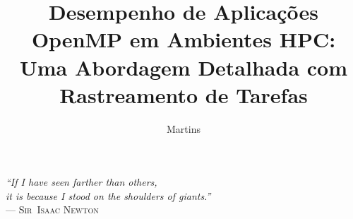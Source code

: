 \documentclass[ppgc,diss]{iiufrgs}
\title{Desempenho de Aplicações OpenMP em Ambientes HPC: Uma Abordagem Detalhada com Rastreamento de Tarefas}
\author{Martins}{Gabriel Dillenburg}
\begin{document}
\maketitle

\clearpage
\begin{flushright}
\mbox{}\vfill
{\sffamily\itshape
``If I have seen farther than others,\\
it is because I stood on the shoulders of giants.''\\}
--- \textsc{Sir~Isaac Newton}
\end{flushright}






\end{document}
